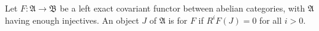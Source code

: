 Let $F: \mathfrak{A} \to \mathfrak{B}$ be a left exact covariant functor between abelian categories, with $\mathfrak{A}$ having enough injectives. An object $J$ of $\mathfrak{A}$ is  for $F$ if $R^i F(J) = 0$ for all $i > 0$.
